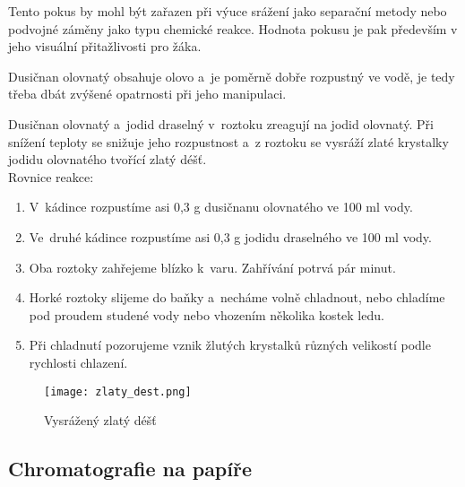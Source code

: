 
Tento pokus by mohl být zařazen při výuce srážení jako separační metody nebo podvojné záměny jako typu chemické reakce. Hodnota pokusu je pak především v jeho visuální přitažlivosti pro žáka.\\

\hspace{-21pt} 

Dusičnan olovnatý obsahuje olovo a~je poměrně dobře rozpustný ve vodě, je tedy třeba dbát zvýšené opatrnosti při jeho manipulaci.\\

\hspace{-21pt} 

Dusičnan olovnatý a~jodid draselný v~roztoku zreagují na jodid olovnatý. Při snížení teploty se snižuje jeho rozpustnost a~z roztoku se vysráží zlaté krystalky jodidu olovnatého tvořící zlatý déšť.\\

Rovnice reakce: \\

\hspace{-21pt} 

\begin{enumerate}
  \item V~kádince rozpustíme asi 0,3 g dusičnanu olovnatého ve 100 ml vody.
  \item Ve~druhé kádince rozpustíme asi 0,3 g jodidu draselného ve 100 ml vody.
  \item Oba roztoky zahřejeme blízko k~varu. Zahřívání potrvá pár minut.
  \item Horké roztoky slijeme do baňky a~necháme volně chladnout, nebo chladíme pod proudem studené vody nebo vhozením několika kostek ledu.
  \item Při chladnutí pozorujeme vznik žlutých krystalků různých velikostí podle rychlosti chlazení.
\end{enumerate}

\begin{figure}[h]
    \centering
    \texttt{[image: zlaty\_dest.png]}
    \caption{Vysrážený zlatý déšť}
\end{figure}
\newpage

\subsection{Chromatografie na papíře}

